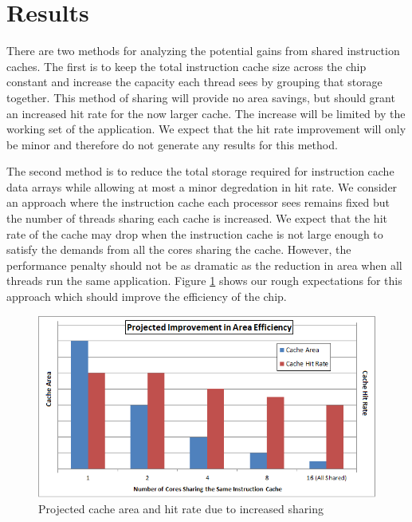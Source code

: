 \section{Results}

There are two methods for analyzing the potential gains from shared
instruction caches.
The first is to keep the total instruction cache size across the chip
constant and increase the capacity each thread sees by grouping that
storage together.
This method of sharing will provide no area savings, but should grant
an increased hit rate for the now larger cache.
The increase will be limited by the working set of the application.
We expect that the hit rate improvement will only be minor and
therefore do not generate any results for this method.


The second method is to reduce the total storage required for
instruction cache data arrays while allowing at most a minor
degredation in hit rate.
We consider an approach where the instruction cache each processor
sees remains fixed but the number of threads sharing each cache is
increased. 
We expect that the hit rate of the cache may drop when the instruction
cache is not large enough to satisfy the demands from all the cores
sharing the cache.
However, the performance penalty should not be as dramatic as the
reduction in area when all threads run the same application.
Figure \ref{AreaEff} shows our rough expectations for this approach
which should improve the efficiency of the chip.

\begin{figure}
\centering
\includegraphics[width=\columnwidth]{graphics/AreaEff.png}
\caption{Projected cache area and hit rate due to increased sharing}
\label{AreaEff}
\end{figure}


